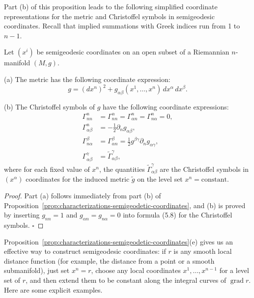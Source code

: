 Part (b) of this proposition leads to the following simplified coordinate representations for the metric and Christoffel symbols in semigeodesic coordinates. Recall that implied summations with Greek indices run from 1 to $n - 1$.

\begin{corollary}
\label{cor:semigeodesic-metric-christoffel}

Let $(x^i)$ be semigeodesic coordinates on an open subset of a Riemannian $n$-manifold $(M, g)$.

(a) The metric has the following coordinate expression:
\[
g = (dx^n)^2 + g_{\alpha\beta}(x^1, \ldots, x^n) \, dx^\alpha \, dx^\beta.
\]

(b) The Christoffel symbols of $g$ have the following coordinate expressions:
\begin{align*}
\Gamma^n_{nn} &= \Gamma^\alpha_{nn} = \Gamma^n_{\alpha n} = \Gamma^n_{n\alpha} = 0,\\
\Gamma^n_{\alpha\beta} &= -\frac{1}{2}\partial_n g_{\alpha\beta},\\
\Gamma^\beta_{n\alpha} &= \Gamma^\beta_{\alpha n} = \frac{1}{2}g^{\beta\gamma}\partial_n g_{\alpha\gamma},\\
\Gamma^\gamma_{\alpha\beta} &= \tilde{\Gamma}^\gamma_{\alpha\beta},
\end{align*}
where for each fixed value of $x^n$, the quantities $\tilde{\Gamma}^\gamma_{\alpha\beta}$ are the Christoffel symbols in $(x^\alpha)$ coordinates for the induced metric $\tilde{g}$ on the level set $x^n = \text{constant}$.
\end{corollary}

\begin{proof}
Part (a) follows immediately from part (b) of Proposition~\ref{prop:characterizations-semigeodetic-coordinates}, and (b) is proved by inserting $g_{nn} = 1$ and $g_{\alpha n} = g_{n\alpha} = 0$ into formula (5.8) for the Christoffel symbols. $\square$
\end{proof}

Proposition~\ref{prop:characterizations-semigeodetic-coordinates}(e) gives us an effective way to construct semigeodesic coordinates: if $r$ is any smooth local distance function (for example, the distance from a point or a smooth submanifold), just set $x^n = r$, choose any local coordinates $x^1, \ldots, x^{n-1}$ for a level set of $r$, and then extend them to be constant along the integral curves of $\operatorname{grad} r$. Here are some explicit examples.

